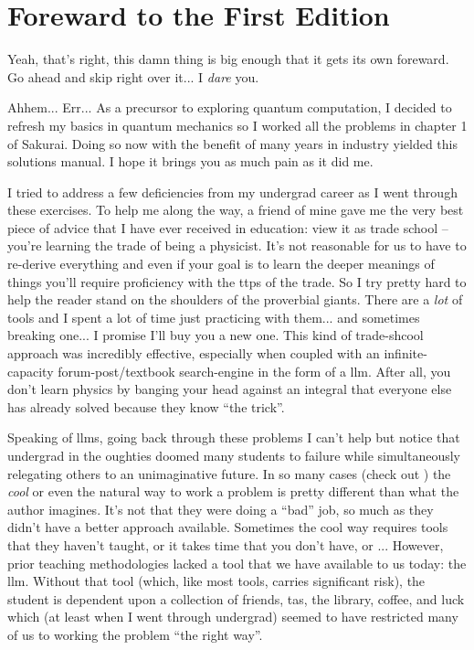 \chapter{Foreward to the First Edition}

Yeah, that's right, this damn thing is big enough that it gets its own
foreward.  Go ahead and skip right over it... I \emph{dare} you.

Ahhem... Err...  As a precursor to exploring quantum computation, I
decided to refresh my basics in quantum mechanics so I worked all the
problems in chapter 1 of Sakurai.  Doing so now with the benefit of
many years in industry yielded this solutions manual.  I hope it
brings you as much pain as it did me.

I tried to address a few deficiencies from my undergrad career as I
went through these exercises.  To help me along the way, a friend of
mine gave me the very best piece of advice that I have ever received
in education: view it as trade school -- you're learning the trade of
being a physicist.  It's not reasonable for us to have to re-derive
everything and even if your goal is to learn the deeper meanings of
things you'll require proficiency with the \acp{ttp} of the trade.  So
I try pretty hard to help the reader stand on the shoulders of the
proverbial giants.  There are a \emph{lot} of tools and I spent a lot
of time just practicing with them... and sometimes breaking one... I
promise I'll buy you a new one.  This kind of trade-shcool approach
was incredibly effective, especially when coupled with an
infinite-capacity forum-post/textbook search-engine in the form of a
\ac{llm}.  After all, you don't learn physics by banging your head
against an integral that everyone else has already solved because they
know ``the trick''.

Speaking of \acp{llm}, going back through these problems I can't help
but notice that undergrad in the oughties doomed many students to
failure while simultaneously relegating others to an unimaginative
future.  In so many cases (check out ) the
\emph{cool} or even the natural way to work a problem is pretty
different than what the author imagines.  It's not that they were
doing a ``bad'' job, so much as they didn't have a better approach
available.  Sometimes the cool way requires tools that they haven't
taught, or it takes time that you don't have, or ...  However, prior
teaching methodologies lacked a tool that we have available to us
today: the \ac{llm}.  Without that tool (which, like most tools,
carries significant risk), the student is dependent upon a collection
of friends, \acp{ta}, the library, coffee, and luck which (at least
when I went through undergrad) seemed to have restricted many of us to
working the problem ``the right way''.


